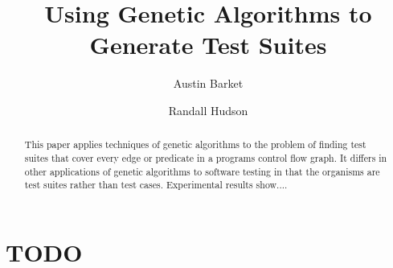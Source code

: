 \documentclass[runningheads]{llncs}
\begin{document}
\pagestyle{headings}
\mainmatter

\title{Using Genetic Algorithms to Generate Test Suites}
\titlerunning{}
\author{Austin Barket \and Randall Hudson}
 \maketitle

\begin{abstract}
This paper applies techniques of genetic algorithms to the problem of finding test suites that cover every edge or predicate in a programs control flow graph. It differs in other applications of genetic algorithms to software testing in that the organisms are test suites rather than test cases. Experimental results show....
\end{abstract}

\section{TODO}
\end{document}
